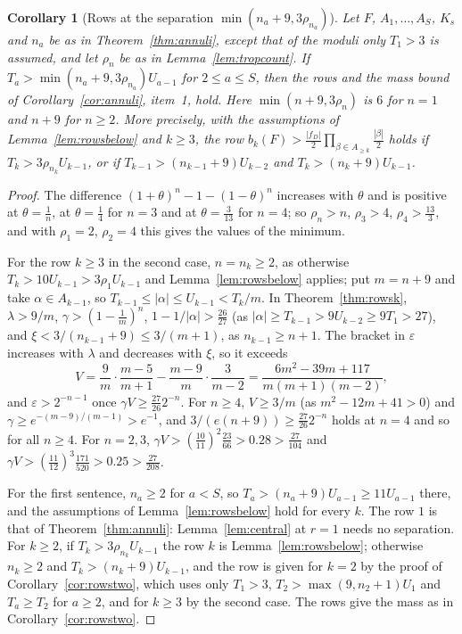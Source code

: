 \documentclass[11pt]{article}
\newtheorem{corollary}[theorem]{Corollary}
\begin{document}
\begin{corollary}[Rows at the separation $\min(n_a+9,3\rho_{n_a})$]\label{cor:rowsall}
Let $F$, $A_1,\ldots,A_S$, $K_s$ and $n_a$ be as in
Theorem~\ref{thm:annuli}, except that of the moduli only $T_1>3$ is
assumed, and let $\rho_n$ be as in Lemma~\ref{lem:tropcount}.  If
$T_a>\min(n_a+9,3\rho_{n_a})U_{a-1}$ for $2\le a\le S$, then the rows and
the mass bound of Corollary~\ref{cor:annuli}, item~1, hold.  Here
$\min(n+9,3\rho_n)$ is $6$ for $n=1$ and $n+9$ for $n\ge2$.  More precisely,
with the assumptions of Lemma~\ref{lem:rowsbelow} and $k\ge3$, the row
$b_k(F)>\frac{|f_D|}2\prod_{\beta\in A_{\ge k}}\frac{|\beta|}2$ holds if
$T_k>3\rho_{n_k}U_{k-1}$, or if $T_{k-1}>(n_{k-1}+9)U_{k-2}$ and
$T_k>(n_k+9)U_{k-1}$.
\end{corollary}

\begin{proof}
The difference $(1+\theta)^n-1-(1-\theta)^n$ increases with $\theta$ and is
positive at $\theta=\frac1n$, at $\theta=\frac14$ for $n=3$ and at
$\theta=\frac3{13}$ for $n=4$; so $\rho_n>n$, $\rho_3>4$, $\rho_4>\frac{13}3$,
and with $\rho_1=2$, $\rho_2=4$ this gives the values of the minimum.

For the row $k\ge3$ in the second case, $n=n_k\ge2$, as otherwise
$T_k>10U_{k-1}>3\rho_1U_{k-1}$ and Lemma~\ref{lem:rowsbelow} applies; put
$m=n+9$ and take $\alpha\in A_{k-1}$, so
$T_{k-1}\le|\alpha|\le U_{k-1}<T_k/m$.  In Theorem~\ref{thm:rowsk},
$\lambda>9/m$, $\gamma>(1-\frac1m)^n$, $1-1/|\alpha|>\frac{26}{27}$ (as
$|\alpha|\ge T_{k-1}>9U_{k-2}\ge9T_1>27$), and
$\xi<3/(n_{k-1}+9)\le3/(m+1)$, as $n_{k-1}\ge n+1$.  The bracket in
$\varepsilon$ increases with $\lambda$ and decreases with $\xi$, so it
exceeds
\[
  V=\frac9m\cdot\frac{m-5}{m+1}-\frac{m-9}m\cdot\frac3{m-2}
  =\frac{6m^2-39m+117}{m(m+1)(m-2)} ,
\]
and $\varepsilon>2^{-n-1}$ once $\gamma V\ge\frac{27}{26}2^{-n}$.  For $n\ge4$,
$V\ge3/m$ (as $m^2-12m+41>0$) and $\gamma\ge e^{-(m-9)/(m-1)}>e^{-1}$, and
$3/(e(n+9))\ge\frac{27}{26}2^{-n}$ holds at $n=4$ and so for all $n\ge4$.
For $n=2,3$, $\gamma V>(\frac{10}{11})^2\frac{23}{66}>0.28>\frac{27}{104}$ and
$\gamma V>(\frac{11}{12})^3\frac{171}{520}>0.25>\frac{27}{208}$.

For the first sentence, $n_a\ge2$ for $a<S$, so $T_a>(n_a+9)U_{a-1}\ge11U_{a-1}$
there, and the assumptions of Lemma~\ref{lem:rowsbelow} hold for every $k$.
The row $1$ is that of Theorem~\ref{thm:annuli}: Lemma~\ref{lem:central} at
$r=1$ needs no separation.  For $k\ge2$, if $T_k>3\rho_{n_k}U_{k-1}$ the row
$k$ is Lemma~\ref{lem:rowsbelow}; otherwise $n_k\ge2$ and
$T_k>(n_k+9)U_{k-1}$, and the row is given for $k=2$ by the proof of
Corollary~\ref{cor:rowstwo}, which uses only $T_1>3$,
$T_2>\max(9,n_2+1)U_1$ and $T_a\ge T_2$ for $a\ge2$, and for $k\ge3$ by the
second case.  The rows give the mass as in Corollary~\ref{cor:rowstwo}.
\end{proof}
\end{document}
